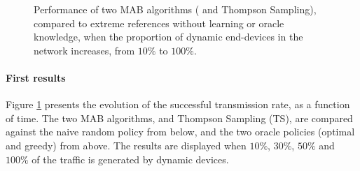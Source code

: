 \begin{figure}[!t]
{    \label{fig:41:50intelligent}}
    \hfill
    \caption{Performance of two MAB algorithms (\UCB{} and Thompson Sampling), compared to extreme references without learning or oracle knowledge, when the proportion of dynamic end-devices in the network increases, from $10\%$ to $100\%$.}
    \label{fig:41:from10to100}
    \vspace*{-10pt}
\end{figure}


\paragraph{First results}

Figure \ref{fig:41:from10to100} presents the evolution of the successful transmission rate, as a function of time.
The two MAB algorithms, \UCB{} and Thompson Sampling (TS), are compared against the naive random policy from below, and the two oracle policies (optimal and greedy) from above.
The results are displayed when $10\%$, $30\%$, $50\%$ and $100\%$ of the traffic is generated by dynamic devices.


